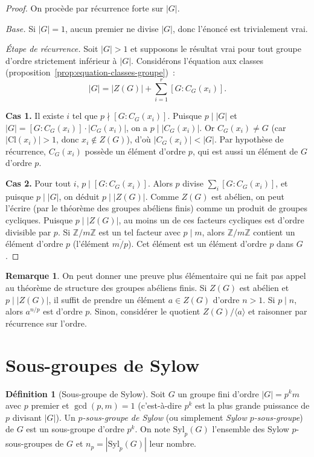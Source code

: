 \documentclass[12pt,a4paper,openany]{book}
\theoremstyle{definition}
\newtheorem{definition}{Définition}[chapter]
\newtheorem{remarque}{Remarque}[chapter]
\newcommand{\Z}{\mathbb{Z}}
\begin{document}
\begin{proof}
  On procède par récurrence forte sur $|G|$.

  \emph{Base.} Si $|G|=1$, aucun premier ne divise $|G|$, donc
  l'énoncé est trivialement vrai.

  \emph{Étape de récurrence.} Soit $|G|>1$ et supposons le résultat
  vrai pour tout groupe d'ordre strictement inférieur à $|G|$.
  Considérons l'équation aux classes
  (proposition~\ref{prop:equation-classes-groupe})~:
  \[
    |G| = |Z(G)| + \sum_{i=1}^{r}[G:C_G(x_i)].
  \]

  \textbf{Cas 1.} Il existe $i$ tel que $p\nmid [G:C_G(x_i)]$.
  Puisque $p\mid |G|$ et $|G| = [G:C_G(x_i)]\cdot|C_G(x_i)|$,
  on a $p\mid |C_G(x_i)|$. Or $C_G(x_i)\neq G$ (car
  $|\mathrm{Cl}(x_i)|>1$, donc $x_i\notin Z(G)$), d'où
  $|C_G(x_i)|<|G|$.
  Par hypothèse de récurrence, $C_G(x_i)$ possède un élément d'ordre
  $p$, qui est aussi un élément de $G$ d'ordre $p$.

  \textbf{Cas 2.} Pour tout $i$, $p\mid [G:C_G(x_i)]$.
  Alors $p$ divise $\sum_i [G:C_G(x_i)]$, et puisque $p\mid |G|$,
  on déduit $p\mid |Z(G)|$.
  Comme $Z(G)$ est abélien, on peut l'écrire (par le théorème des
  groupes abéliens finis) comme un produit de groupes cycliques. Puisque
  $p\mid |Z(G)|$, au moins un de ces facteurs cycliques est d'ordre
  divisible par $p$. Si $\Z/m\Z$ est un tel facteur avec $p\mid m$,
  alors $\Z/m\Z$ contient un élément d'ordre $p$ (l'élément
  $\overline{m/p}$). Cet élément est un élément d'ordre $p$ dans $G$.
\end{proof}

\begin{remarque}\label{rem:cauchy-elementaire}
  On peut donner une preuve plus élémentaire qui ne fait pas appel
  au théorème de structure des groupes abéliens finis. Si $Z(G)$ est
  abélien et $p\mid |Z(G)|$, il suffit de prendre un élément
  $a\in Z(G)$ d'ordre $n>1$. Si $p\mid n$, alors $a^{n/p}$ est
  d'ordre $p$. Sinon, considérer le quotient $Z(G)/\langle a\rangle$
  et raisonner par récurrence sur l'ordre.
\end{remarque}

\section{Sous-groupes de Sylow}\label{sec:sylow}

\begin{definition}[Sous-groupe de Sylow]\label{def:sylow}
  Soit $G$ un groupe fini d'ordre $|G|=p^k m$ avec $p$ premier et
  $\gcd(p,m)=1$ (c'est-à-dire $p^k$ est la plus grande puissance de $p$
  divisant $|G|$). Un \emph{$p$-sous-groupe de
  Sylow} (ou simplement \emph{Sylow
  $p$-sous-groupe}) de $G$ est un sous-groupe d'ordre $p^k$.
  On note $\mathrm{Syl}_p(G)$ l'ensemble des Sylow $p$-sous-groupes
  de $G$ et $n_p = |\mathrm{Syl}_p(G)|$ leur nombre.
\end{definition}
\end{document}
